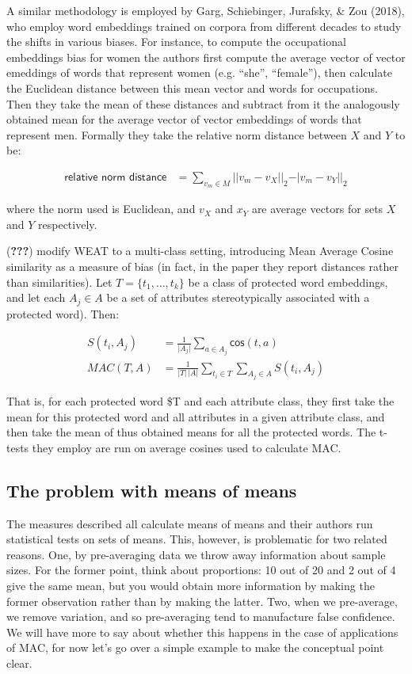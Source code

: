\documentclass[10pt,dvipsnames,enabledeprecatedfontcommands]{scrartcl}
\begin{document}
A similar methodology is employed by Garg, Schiebinger, Jurafsky, \& Zou
(2018), who employ word embeddings trained on corpora from different
decades to study the shifts in various biases. For instance, to compute
the occupational embeddings bias for women the authors first compute the
average vector of vector emeddings of words that represent women (e.g.
``she'', ``female''), then calculate the Euclidean distance between this
mean vector and words for occupations. Then they take the mean of these
distances and subtract from it the analogously obtained mean for the
average vector of vector embeddings of words that represent men.
Formally they take the relative norm distance between \(X\) and \(Y\) to
be:

\begin{align}
\textsf{relative norm distance} & = \sum_{v_m\in M} \vert \vert v_m - v_X\vert \vert_2 - \vert v_m - v_Y\vert \vert_2
\end{align}

\noindent where the norm used is Euclidean, and \(v_X\) and \(x_Y\) are
average vectors for sets \(X\) and \(Y\) respectively.

({\textbf{???}}) modify WEAT to a multi-class setting, introducing Mean
Average Cosine similarity as a measure of bias (in fact, in the paper
they report distances rather than similarities). Let
\(T = \{t_1, \dots, t_k\}\) be a class of protected word embeddings, and
let each \(A_j\in A\) be a set of attributes stereotypically associated
with a protected word). Then:

\begin{align}
S(t_i, A_j) & = \frac{1}{\vert A_j\vert}\sum_{a\in A_j}\mathsf{cos}(t,a) \\
MAC(T,A) & = \frac{1}{\vert T \vert \,\vert A\vert}\sum_{t_i \in T }\sum_{A_j \in A} S(t_i,A_j)
\end{align}

That is, for each protected word \$T and each attribute class, they
first take the mean for this protected word and all attributes in a
given attribute class, and then take the mean of thus obtained means for
all the protected words. The t-tests they employ are run on average
cosines used to calculate MAC.

\subsection{The problem with means of
means}\label{the-problem-with-means-of-means}

The measures described all calculate means of means and their authors
run statistical tests on sets of means. This, however, is problematic
for two related reasons. One, by pre-averaging data we throw away
information about sample sizes. For the former point, think about
proportions: 10 out of 20 and 2 out of 4 give the same mean, but you
would obtain more information by making the former observation rather
than by making the latter. Two, when we pre-average, we remove
variation, and so pre-averaging tend to manufacture false confidence. We
will have more to say about whether this happens in the case of
applications of MAC, for now let's go over a simple example to make the
conceptual point clear.
\end{document}
